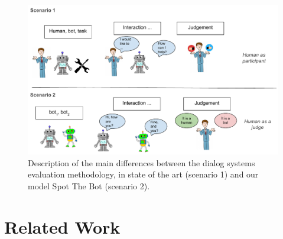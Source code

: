 \documentclass[11pt,a4paper]{article}
\begin{document}
\begin{figure}
    \centering
    \includegraphics[scale=0.5]{figures/motivation_example_spotTheBot.pdf}
    \caption{Description of the main differences between the dialog systems evaluation methodology, in state of the art (scenario 1) and our model Spot The Bot (scenario 2).}
    \label{fig:motiv}
\end{figure}

\section{Related Work}
\label{sota}
\end{document}
